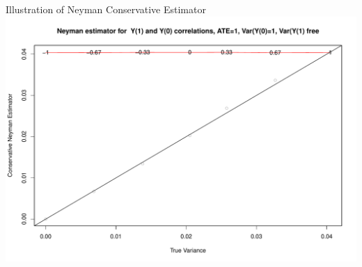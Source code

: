 \documentclass[
  11pt,
  ignorenonframetext,
]{beamer}
\begin{document}
\begin{frame}{Illustration of Neyman Conservative Estimator}
\protect\hypertarget{illustration-of-neyman-conservative-estimator-1}{}
\includegraphics{0_lectures_files/figure-beamer/unnamed-chunk-293-1.pdf}
\end{frame}
\end{document}
